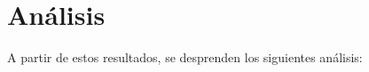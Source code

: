% 
% 
% 
% 
% 
%  
% 

\newpage
\section{An\'alisis} 
 A partir de estos resultados, se desprenden los siguientes an\'alisis:\\
 
